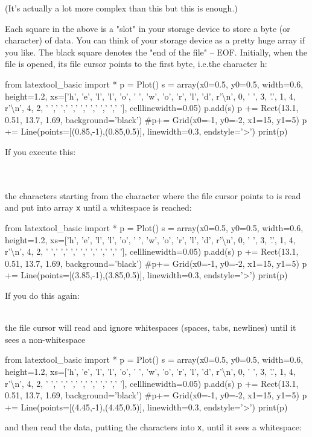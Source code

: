 (It's actually a lot more complex than this but this is enough.)

Each square in the above is a "slot" in your storage device to store a byte (or character) of data. You can think of your storage device as a pretty huge array if you like. The black square denotes the "end of the file" -- EOF. Initially, when the file is opened, its file cursor points to the first byte, i.e.the character h:

\begin{python}
from latextool_basic import *
p = Plot()
s = array(x0=0.5, y0=0.5, width=0.6, height=1.2, xs=['h', 'e', 'l', 'l', 'o', ' ', 'w', 'o', 'r', 'l', 'd', r'\textbackslash n', 0, ' ', 3, '.', 1, 4, r'\textbackslash  n', 4, 2, ' ',' ',' ',' ',' ',' ',' ',' '], celllinewidth=0.05)
p.add(s)
p += Rect(13.1, 0.51, 13.7, 1.69, background='black')
#p+= Grid(x0=-1, y0=-2, x1=15, y1=5)
p += Line(points=[(0.85,-1),(0.85,0.5)], linewidth=0.3, endstyle='>')
print(p)
\end{python}
If you execute this:

\\
\\

the characters starting from the character where the file cursor points to is read and put into array \texttt{x} until a whitespace is reached:

\begin{python}
from latextool_basic import *
p = Plot()
s = array(x0=0.5, y0=0.5, width=0.6, height=1.2, xs=['h', 'e', 'l', 'l', 'o', ' ', 'w', 'o', 'r', 'l', 'd', r'\textbackslash n', 0, ' ', 3, '.', 1, 4, r'\textbackslash  n', 4, 2, ' ',' ',' ',' ',' ',' ',' ',' '], celllinewidth=0.05)
p.add(s)
p += Rect(13.1, 0.51, 13.7, 1.69, background='black')
#p+= Grid(x0=-1, y0=-2, x1=15, y1=5)
p += Line(points=[(3.85,-1),(3.85,0.5)], linewidth=0.3, endstyle='>')
print(p)
\end{python}
If you do this again:

\\

the file cursor will read and ignore whitespaces (spaces, tabs,
newlines) until it sees a non-whitespace

\begin{python}
from latextool_basic import *
p = Plot()
s = array(x0=0.5, y0=0.5, width=0.6, height=1.2, xs=['h', 'e', 'l', 'l', 'o', ' ', 'w', 'o', 'r', 'l', 'd', r'\textbackslash n', 0, ' ', 3, '.', 1, 4, r'\textbackslash  n', 4, 2, ' ',' ',' ',' ',' ',' ',' ',' '], celllinewidth=0.05)
p.add(s)
p += Rect(13.1, 0.51, 13.7, 1.69, background='black')
#p+= Grid(x0=-1, y0=-2, x1=15, y1=5)
p += Line(points=[(4.45,-1),(4.45,0.5)], linewidth=0.3, endstyle='>')
print(p)
\end{python}
and then read the data, putting the characters into \texttt{x}, until it sees a whitespace:


